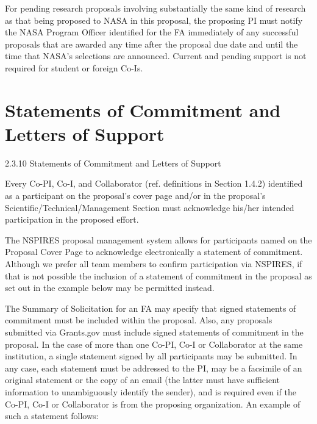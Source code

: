 \documentclass[12pt]{article}
\begin{document}
For pending research proposals involving substantially the same kind
of research as that being proposed to NASA in this proposal, the
proposing PI must notify the NASA Program Officer identified for the
FA immediately of any successful proposals that are awarded any time
after the proposal due date and until the time that NASA's selections
are announced.  Current and pending support is not required for
student or foreign Co-Is.



\cleardoublepage

\section*{Statements of Commitment and Letters of Support}
2.3.10 Statements of Commitment and Letters of Support

Every Co-PI, Co-I, and Collaborator (ref. definitions in Section
1.4.2) identified as a participant on the proposal's cover page and/or
in the proposal's Scientific/Technical/Management Section must
acknowledge his/her intended participation in the proposed effort.

The NSPIRES proposal management system allows for participants named
on the Proposal Cover Page to acknowledge electronically a statement
of commitment. Although we prefer all team members to confirm
participation via NSPIRES, if that is not possible the inclusion of a
statement of commitment in the proposal as set out in the example
below may be permitted instead.

The Summary of Solicitation for an FA may specify that signed
statements of commitment must be included within the proposal. Also,
any proposals submitted via Grants.gov must include signed statements
of commitment in the proposal. In the case of more than one Co-PI,
Co-I or Collaborator at the same institution, a single statement
signed by all participants may be submitted. In any case, each
statement must be addressed to the PI, may be a facsimile of an
original statement or the copy of an email (the latter must have
sufficient information to unambiguously identify the sender), and is
required even if the Co-PI, Co-I or Collaborator is from the proposing
organization. An example of such a statement follows:
\end{document}
